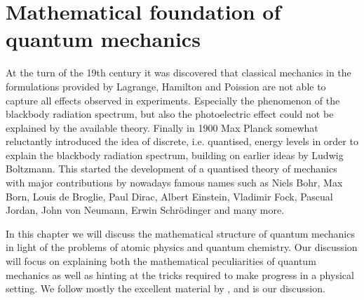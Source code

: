\chapter{Mathematical foundation of quantum mechanics}


At the turn of the 19th century it was discovered
that classical mechanics in the formulations provided
by Lagrange, Hamilton and Poission
are not able to capture all effects observed in experiments.
Especially the phenomenon of the blackbody radiation spectrum,
but also the photoelectric effect could not be explained by the available theory.
Finally in 1900 Max Planck somewhat reluctantly introduced the idea of
discrete, i.e. quantised, energy levels
in order to explain the blackbody radiation spectrum,
building on earlier ideas by Ludwig Boltzmann.
This started the development of a quantised theory of mechanics
with major contributions by nowadays famous
names such as Niels Bohr, Max Born, Louis de Broglie, Paul Dirac, Albert Einstein, Vladimir Fock, Pascual Jordan, John von Neumann, Erwin Schrödinger and many more.

In this chapter we will discuss the mathematical structure
of quantum mechanics in light of the problems of atomic physics
and quantum chemistry.
Our discussion will focus on explaining both the mathematical
peculiarities of quantum mechanics as well as hinting
at the tricks required to make progress in a physical setting.
We follow mostly the excellent material by \citet{Shankar1994},
\citet{Mueller2000} and \citet{Helffer2013} is our discussion.





